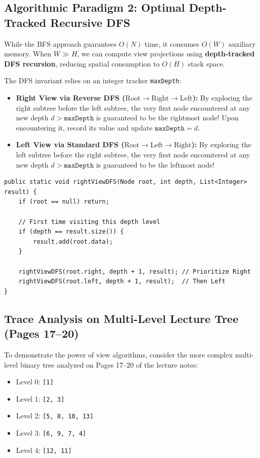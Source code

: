 \documentclass[10pt,journal,compsoc,onecolumn]{IEEEtran}
\begin{document}
\subsection{Algorithmic Paradigm 2: Optimal Depth-Tracked Recursive DFS}

While the BFS approach guarantees $O(N)$ time, it consumes $O(W)$ auxiliary memory. When $W \gg H$, we can compute view projections using \textbf{depth-tracked DFS recursion}, reducing spatial consumption to $O(H)$ stack space.

The DFS invariant relies on an integer tracker \texttt{maxDepth}:
\begin{itemize}
    \item \textbf{Right View via Reverse DFS ($\text{Root} \to \text{Right} \to \text{Left}$):} By exploring the right subtree before the left subtree, the very first node encountered at any new depth $d > \texttt{maxDepth}$ is guaranteed to be the rightmost node! Upon encountering it, record its value and update $\texttt{maxDepth} = d$.
    \item \textbf{Left View via Standard DFS ($\text{Root} \to \text{Left} \to \text{Right}$):} By exploring the left subtree before the right subtree, the very first node encountered at any new depth $d > \texttt{maxDepth}$ is guaranteed to be the leftmost node!
\end{itemize}

\begin{verbatim}
public static void rightViewDFS(Node root, int depth, List<Integer> result) {
    if (root == null) return;

    // First time visiting this depth level
    if (depth == result.size()) {
        result.add(root.data);
    }

    rightViewDFS(root.right, depth + 1, result); // Prioritize Right
    rightViewDFS(root.left, depth + 1, result);  // Then Left
}
\end{verbatim}

\subsection{Trace Analysis on Multi-Level Lecture Tree (Pages 17--20)}

To demonstrate the power of view algorithms, consider the more complex multi-level binary tree analyzed on Pages 17--20 of the lecture notes:
\begin{itemize}
    \item Level 0: \texttt{[1]}
    \item Level 1: \texttt{[2, 3]}
    \item Level 2: \texttt{[5, 8, 10, 13]}
    \item Level 3: \texttt{[6, 9, 7, 4]}
    \item Level 4: \texttt{[12, 11]}
\end{itemize}
\end{document}
